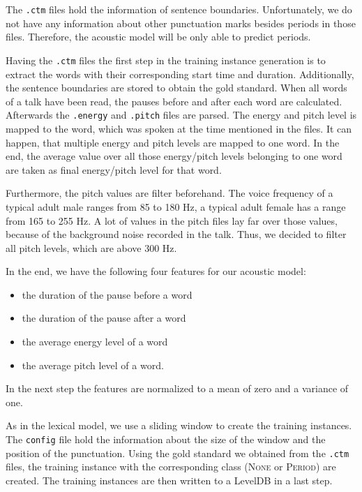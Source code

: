 The \texttt{.ctm} files hold the information of sentence boundaries.
Unfortunately, we do not have any information about other punctuation marks besides periods in those files.
Therefore, the acoustic model will be only able to predict periods.

Having the \texttt{.ctm} files the first step in the training instance generation is to extract the words with their corresponding start time and duration.
Additionally, the sentence boundaries are stored to obtain the gold standard.
When all words of a talk have been read, the pauses before and after each word are calculated.
Afterwards the \texttt{.energy} and \texttt{.pitch} files are parsed.
The energy and pitch level is mapped to the word, which was spoken at the time mentioned in the files.
It can happen, that multiple energy and pitch levels are mapped to one word.
In the end, the average value over all those energy/pitch levels belonging to one word are taken as final energy/pitch level for that word.

Furthermore, the pitch values are filter beforehand.
The voice frequency of a typical adult male ranges from 85 to 180 Hz, a typical adult female has a range from 165 to 255 Hz.
A lot of values in the pitch files lay far over those values, because of the background noise recorded in the talk.
Thus, we decided to filter all pitch levels, which are above 300 Hz.

In the end, we have the following four features for our acoustic model:
\begin{itemize}
	\item the duration of the pause before a word
	\item the duration of the pause after a word
	\item the average energy level of a word
	\item the average pitch level of a word.
\end{itemize}
In the next step the features are normalized to a mean of zero and a variance of one.

As in the lexical model, we use a sliding window to create the training instances.
The \texttt{config} file hold the information about the size of the window and the position of the punctuation.
Using the gold standard we obtained from the \texttt{.ctm} files, the training instance with the corresponding class (\textsc{None} or \textsc{Period}) are created.
The training instances are then written to a LevelDB in a last step.

